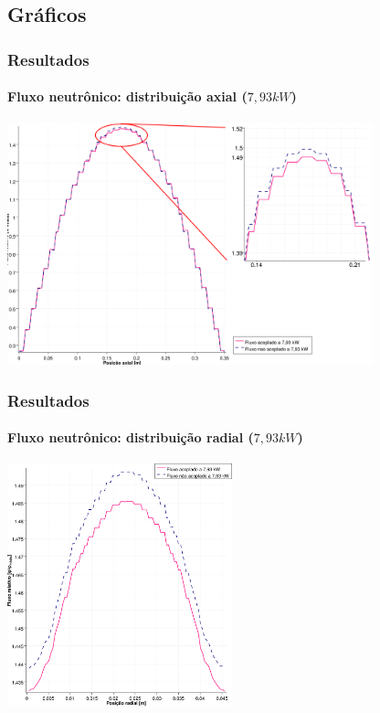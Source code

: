 \documentclass[svgnames,smaller,table]{beamer}
\begin{document}
\subsection{Gráficos}
\begin{frame}
  \frametitle{Resultados}
  \framesubtitle{Fluxo neutrônico: distribuição axial ($7,93 kW$)}
  \centering\includegraphics[width=\textwidth, height=7.0cm]{../figuras/Flux_rel_z_200_port_trabalhado.png}
  \label{fig:flux200z}
\end{frame}

\begin{frame}
  \frametitle{Resultados}
  \framesubtitle{Fluxo neutrônico: distribuição radial ($7,93 kW$)}
  \centering\includegraphics[width=\textwidth, height=7.0cm]{../figuras/Flux_rel_x_200_port.png}
  \label{fig:flux200x}
\end{frame}
\end{document}
